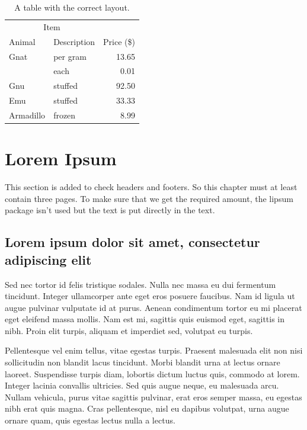 \begin{table}
  \centering
  \begin{tabular}{@{}llr@{}} \toprule
    \multicolumn{2}{c}{Item} \\ \cmidrule(r){1-2}
    Animal    & Description & Price (\$)\\ \midrule
    Gnat      & per gram    & 13.65 \\
              & each        & 0.01 \\
    Gnu       & stuffed     & 92.50 \\
    Emu       & stuffed     & 33.33 \\
    Armadillo & frozen      & 8.99 \\ \bottomrule
  \end{tabular}
  \caption{A table with the correct layout.}
  \label{tab:ok}
\end{table}

\section{Lorem Ipsum}
This section is added to check headers and footers. So this chapter must at
least contain three pages. To make sure that we get the required amount,
the \textsf{lipsum} package isn't used but the text is put directly in the
text.

\subsection{Lorem ipsum dolor sit amet, consectetur adipiscing elit}
Sed nec tortor id felis tristique sodales. Nulla nec massa eu dui fermentum
tincidunt. Integer ullamcorper ante eget eros posuere faucibus. Nam id
ligula ut augue pulvinar vulputate id at purus. Aenean condimentum tortor
eu mi placerat eget eleifend massa mollis. Nam est mi, sagittis quis
euismod eget, sagittis in nibh. Proin elit turpis, aliquam et imperdiet
sed, volutpat eu turpis.

Pellentesque vel enim tellus, vitae egestas turpis. Praesent malesuada elit
non nisi sollicitudin non blandit lacus tincidunt. Morbi blandit urna at
lectus ornare laoreet. Suspendisse turpis diam, lobortis dictum luctus
quis, commodo at lorem. Integer lacinia convallis ultricies. Sed quis augue
neque, eu malesuada arcu. Nullam vehicula, purus vitae sagittis pulvinar,
erat eros semper massa, eu egestas nibh erat quis magna. Cras pellentesque,
nisl eu dapibus volutpat, urna augue ornare quam, quis egestas lectus nulla
a lectus.

